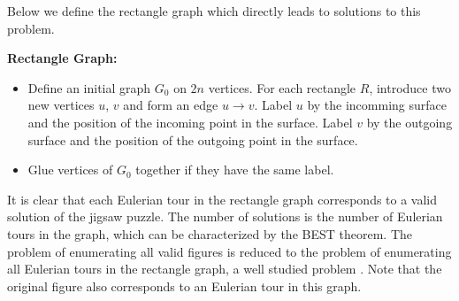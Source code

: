 \documentclass[a4paper]{article}
\begin{document}
Below we define the rectangle graph which directly leads to solutions to this problem.

\textbf{Rectangle Graph:}
\begin{itemize}
\item  Define an initial graph $G_0$ on $2n$ vertices. For each rectangle $R$, introduce two new vertices $u$, $v$ and form an edge $u \rightarrow v$.
Label $u$ by the incomming surface and the position of the incoming point in the surface. Label $v$ by the outgoing surface and the position of the outgoing point
in the surface.
\item Glue vertices of $G_0$ together if they have the same label.
\end{itemize}

It is clear that each Eulerian tour in the rectangle graph corresponds to a valid solution of the jigsaw puzzle. The number of solutions is the number of
Eulerian tours in the graph, which can be characterized by the BEST \cite{best} theorem. The problem of enumerating all valid figures is reduced to the problem of enumerating
all Eulerian tours in the rectangle graph, a well studied problem \cite{abrham80}. 
Note that the original figure also corresponds to an Eulerian tour in this graph.  

\end{document}
